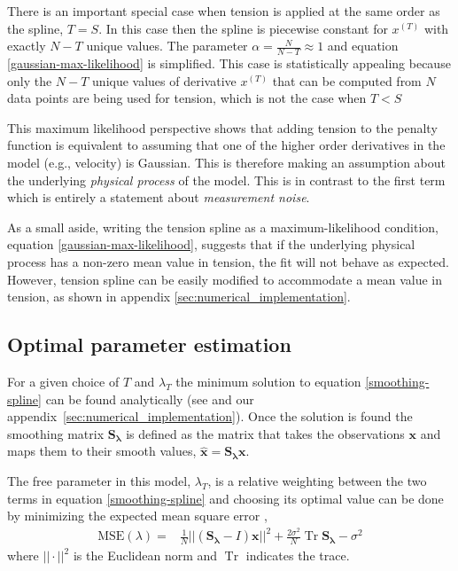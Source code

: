 \documentclass[10pt,journal]{IEEEtran}
\DeclareMathOperator{\Tr}{Tr}
\begin{document}
There is an important special case when tension is applied at the same order as the spline, $T=S$. In this case then the spline is piecewise constant for $x^{(T)}$ with exactly $N-T$ unique values. The parameter $\alpha =\frac{N}{N-T}\approx 1$ and equation \ref{gaussian-max-likelihood} is simplified. This case is statistically appealing because only the $N-T$ unique values of derivative $x^{(T)}$ that can be computed from $N$ data points are being used for tension, which is not the case when $T<S$

This maximum likelihood perspective shows that adding tension to the penalty function is equivalent to assuming that one of the higher order derivatives in the model (e.g., velocity) is Gaussian. This is therefore making an assumption about the underlying \emph{physical process} of the model. This is in contrast to the first term which is entirely a statement about \emph{measurement noise}.

As a small aside, writing the tension spline as a maximum-likelihood condition, equation \ref{gaussian-max-likelihood}, suggests that if the underlying physical process has a non-zero mean value in tension, the fit will not behave as expected. However, tension spline can be easily modified to accommodate a mean value in tension, as shown in appendix \ref{sec:numerical_implementation}. 

\subsection{Optimal parameter estimation} \label{sec:optimal_parameter}

For a given choice of $T$ and $\lambda_T$ the minimum solution to equation \ref{smoothing-spline} can be found analytically (see \cite{teanby2007-mg} and our appendix~\ref{sec:numerical_implementation}). Once the solution is found the smoothing matrix $\mathbf{S_\lambda}$ is defined as the matrix that takes the observations $\mathbf{x}$ and maps them to their smooth values, $\mathbf{\hat{x}} = \mathbf{S_\lambda} \mathbf{x}$.

The free parameter in this model, $\lambda_T$, is a relative weighting between the two terms in equation \ref{smoothing-spline} and choosing its optimal value can be done by minimizing the expected mean square error \cite{craven1979-nm},
\begin{align}
\label{MSE}
    \textrm{MSE}(\lambda) =& \frac{1}{N} || \left( \mathbf{S_\lambda} - I \right) \mathbf{x} ||^2 + \frac{2 \sigma^2}{N}  \Tr \mathbf{S_\lambda} - \sigma^2
\end{align}
where $||\cdot||^2$ is the Euclidean norm and $\Tr$ indicates the trace.
\end{document}
